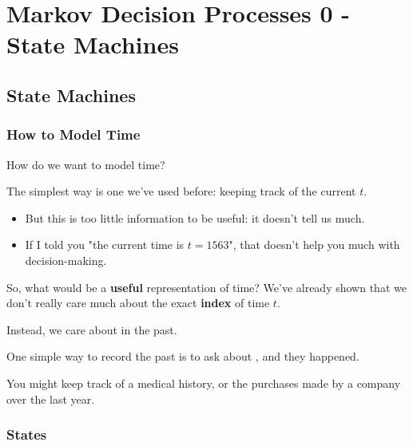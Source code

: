 \setcounter{chapter}{10-1} %

\chapter{Markov Decision Processes 0 - State Machines}

\setcounter{section}{0}

\section{State Machines}

    \subsection{How to Model Time}

        How do we want to model time?

        The simplest way is one we've used before: keeping track of the current  $t$.

        \begin{itemize}
            \item But this is too little information to be useful: it doesn't tell us much.
            \item \miniex If I told you "the current time is $t=1563$", that doesn't help you much with decision-making.
        \end{itemize}

        So, what would be a \textbf{useful} representation of time? We've already shown that we don't really care much about the exact \textbf{index} of time $t$.

        Instead, we care about  in the past.\\

        \begin{concept}
            One simple way to record the past is to ask about , and  they happened.
        \end{concept}

        \miniex You might keep track of a medical history, or the purchases made by a company over the last year.


    \phantom{}

    \subsection{States}

